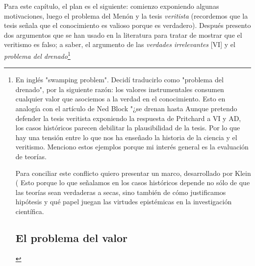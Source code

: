 Para este capítulo, el plan es el siguiente: comienzo exponiendo algunas motivaciones, luego el problema del Menón y la tesis \textit{veritista} (recordemos que la tesis señala que el conocimiento es valioso porque es verdadero).
Después presento dos argumentos que se han usado en la literatura para tratar de mostrar que el veritismo es falso; a saber, el argumento de las \emph{verdades irrelevantes} [VI] y el \emph{problema del drenado}\footnote{En inglés "swamping problem". Decidí traducirlo como "problema del drenado", por la siguiente razón: los valores instrumentales consumen cualquier valor que asociemos a la verdad en el conocimiento. Esto en analogía con el artículo de Ned Block "¿se drenan hasta %
Aunque pretendo defender la tesis veritista exponiendo la respuesta de Pritchard a VI y AD, los casos históricos parecen debilitar la plausibilidad de la tesis.%
Por lo que hay una tensión entre lo que nos ha enseñado la historia de la ciencia y el veritismo.
Menciono estos ejemplos porque mi interés general es la evaluación de teorías.%

Para conciliar este conflicto quiero presentar un marco, desarrollado por Klein (%
Esto porque lo que señalamos en los casos históricos depende no sólo de que las teorías sean verdaderas a secas, sino también de cómo justificamos hipótesis y qué papel juegan las virtudes epistémicas en la investigación científica.

\subsection{El problema del valor}

}
